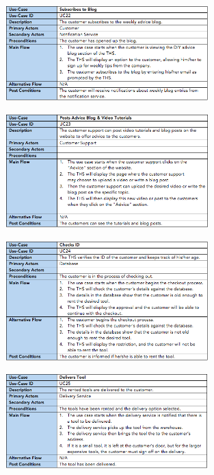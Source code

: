 \documentclass[fontsize=11pt]{extarticle}
\numberwithin{figure}{section} %
\numberwithin{table}{section}%
\begin{document}
\begin{figure}[H]
      \centering
      \includegraphics[trim = 0 0 0 0, clip, width=0.7\textwidth]{TempImg/UC22.png}
 \end{figure}

\begin{figure}[H]
      \centering
      \includegraphics[trim = 0 0 0 0, clip, width=0.7\textwidth]{TempImg/UC23.png}
 \end{figure}

\begin{figure}[H]
      \centering
      \includegraphics[trim = 0 0 0 0, clip, width=0.7\textwidth]{TempImg/UC24.png}
 \end{figure}

\begin{figure}[H]
      \centering
      \includegraphics[trim = 0 0 0 0, clip, width=0.7\textwidth]{TempImg/UC25.png}
 \end{figure}
\end{document}
